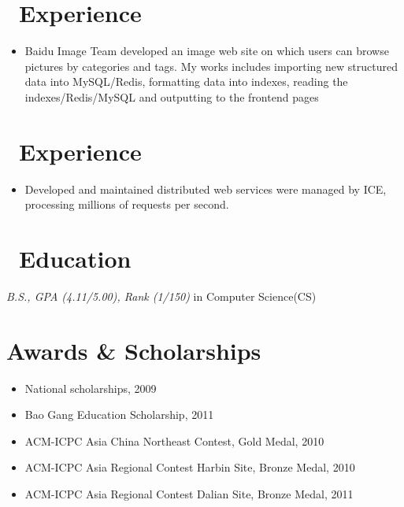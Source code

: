 \documentclass{resume}
\begin{document}
\section{\faUsers\ Experience}
 {}{}
\begin{itemize}
    \item Baidu Image Team developed an image web site on which users can browse pictures by categories and tags. My works includes importing new structured data into MySQL/Redis, formatting data into indexes, reading the indexes/Redis/MySQL and outputting to the frontend pages
\end{itemize}

\section{\faUsers\ Experience}
 {}{}
\begin{itemize}
    \item  Developed and maintained distributed web services were managed by ICE, processing millions of requests per second.
\end{itemize}

\section{\faGraduationCap\ Education}
\textit{B.S.,  GPA (4.11/5.00), Rank (1/150)} in Computer Science(CS)

\section{Awards \& Scholarships}
\begin{itemize}
    \item National scholarships, 2009
    \item Bao Gang Education Scholarship, 2011
    \item ACM-ICPC Asia China Northeast Contest, Gold Medal, 2010
    \item ACM-ICPC Asia Regional Contest Harbin Site, Bronze Medal, 2010
    \item ACM-ICPC Asia Regional Contest Dalian Site, Bronze Medal, 2011
\end{itemize}
\end{document}
